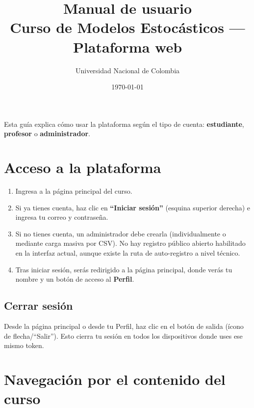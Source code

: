 \documentclass[11pt,a4paper]{article}
\title{\textbf{Manual de usuario}\\[4pt]\large Curso de Modelos Estocásticos --- Plataforma web}
\author{Universidad Nacional de Colombia}
\date{\today}
\begin{document}
\maketitle
\thispagestyle{fancy}

\tableofcontents
\newpage

Esta guía explica cómo usar la plataforma según el tipo de cuenta: \textbf{estudiante}, \textbf{profesor} o \textbf{administrador}.

\section{Acceso a la plataforma}

\begin{enumerate}
  \item Ingresa a la página principal del curso.
  \item Si ya tienes cuenta, haz clic en \textbf{``Iniciar sesión''} (esquina superior derecha) e ingresa tu correo y contraseña.
  \item Si no tienes cuenta, un administrador debe crearla (individualmente o mediante carga masiva por CSV). No hay registro público abierto habilitado en la interfaz actual, aunque existe la ruta de auto-registro a nivel técnico.
  \item Tras iniciar sesión, serás redirigido a la página principal, donde verás tu nombre y un botón de acceso al \textbf{Perfil}.
\end{enumerate}

\subsection*{Cerrar sesión}

Desde la página principal o desde tu Perfil, haz clic en el botón de salida (ícono de flecha/``Salir''). Esto cierra tu sesión en todos los dispositivos donde uses ese mismo token.

\section{Navegación por el contenido del curso}
\end{document}
